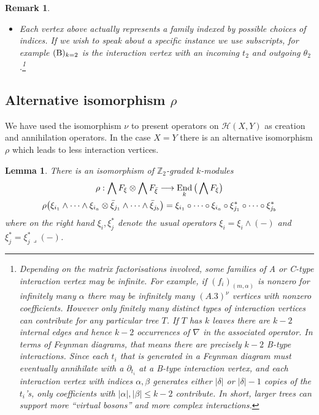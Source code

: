 \documentclass[english,letter paper,12pt,leqno]{article}
\newtheorem{lemma}[theorem]{Lemma}
\theoremstyle{example}
\newtheorem{remark}[theorem]{Remark}
\numberwithin{equation}{section}
\def\AA{\mathcal{A}}
\def\HH{\HH}
\def\HH{\mathcal{H}}
\def\nZ{\mathds{Z}}
\DeclareMathOperator{\End}{End}
\DeclareMathOperator{\vAt}{At}
\begin{document}
\begin{remark}
\begin{itemize}
\item Each vertex above actually represents a family indexed by possible choices of indices. If we wish to speak about a specific instance we use subscripts, for example $(\textup{B})_{k=2}$ is the interaction vertex with an incoming $t_2$ and outgoing $\theta_2$.\footnote{Depending on the matrix factorisations involved, some families of A or C-type interaction vertex may be \emph{infinite}. For example, if $(f_i)_{(m, \alpha)}$ is nonzero for infinitely many $\alpha$ there may be infinitely many $(A.3)^{\nu}$ vertices with nonzero coefficients. However only finitely many distinct types of interaction vertices can contribute for any particular tree $T$. If $T$ has $k$ leaves there are $k - 2$ internal edges and hence $k - 2$ occurrences of $\nabla$ in the associated operator. In terms of Feynman diagrams, that means there are precisely $k - 2$ B-type interactions. Since each $t_i$ that is generated in a Feynman diagram must eventually annihilate with a $\partial_{t_i}$ at a B-type interaction vertex, and each interaction vertex with indices $\alpha, \beta$ generates either $|\delta|$ or $|\delta| - 1$ copies of the $t_i$'s, only coefficients with $|\alpha|, |\beta| \le k - 2$ contribute. In short, larger trees can support more ``virtual bosons'' and more complex interactions.}
\end{itemize}
\end{remark}

\subsection{Alternative isomorphism $\rho$}\label{section:altrho}

We have used the isomorphism $\nu$ to present operators on $\HH(X,Y)$ as creation and annihilation operators. In the case $X = Y$ there is an alternative isomorphism $\rho$ which leads to less interaction vertices.

\begin{lemma}\label{lemma:iso_rho} There is an isomorphism of $\nZ_2$-graded $k$-modules
\begin{gather*}
\rho: \bigwedge F_\xi \otimes \bigwedge F_{\Bar{\xi}} \lto \End_k\big( \bigwedge F_\xi \big)\\
\rho\big( \xi_{i_1} \wedge \cdots \wedge \xi_{i_a} \otimes \Bar{\xi}_{j_1} \wedge \cdots \wedge \Bar{\xi}_{j_b} \big) = \xi_{i_1} \circ \cdots \circ \xi_{i_a} \circ \xi_{j_1}^* \circ \cdots \circ \xi_{j_b}^*
\end{gather*}
where on the right hand $\xi_i, \xi_j^*$ denote the usual operators $\xi_i = \xi_i \wedge (-)$ and $\xi_j^* = \xi_j^* \lrcorner (-)$.
\end{lemma}
\end{document}
